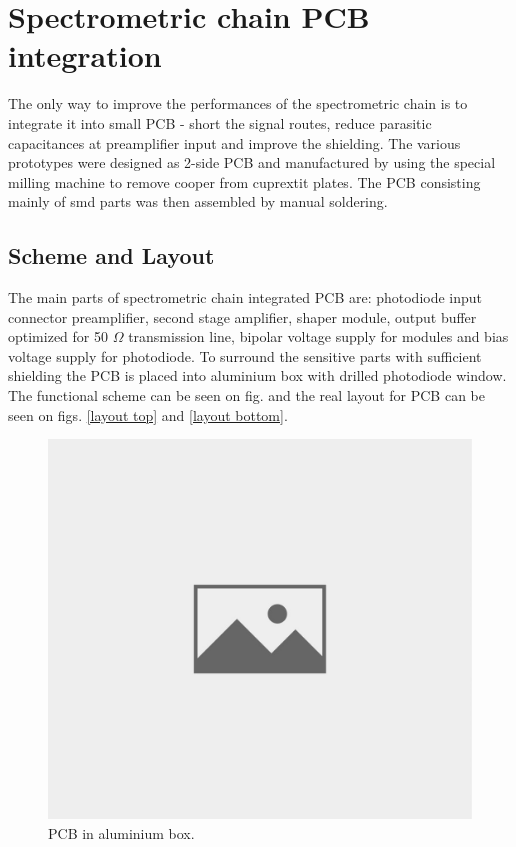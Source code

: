 \chapter{Spectrometric chain PCB integration}
The only way to improve the performances of the spectrometric chain is to integrate it into small PCB - short the signal routes, reduce parasitic capacitances at preamplifier input and improve the shielding. The various prototypes were designed as 2-side PCB and manufactured by using the special milling machine to remove cooper from cuprextit plates. The PCB consisting mainly of smd parts was then assembled by manual soldering.

\section{Scheme and Layout}
The main parts of spectrometric chain integrated PCB are: photodiode input connector preamplifier, second stage amplifier, shaper module, output buffer optimized for 50 $\Omega$ transmission line, bipolar voltage supply for modules and bias voltage supply for photodiode. To surround the sensitive parts with sufficient shielding the PCB is placed into aluminium box with drilled photodiode window. The functional scheme can be seen on fig. and the real layout for PCB can be seen on figs. \ref{layout top} and \ref{layout bottom}.



\begin{figure}[H]
 \centering
 \includegraphics[scale=0.35, angle = 0]{./pictures/NoPicture.jpg}
 \caption{PCB in aluminium box.}
 \label{PCBbox}
 
\end{figure}


